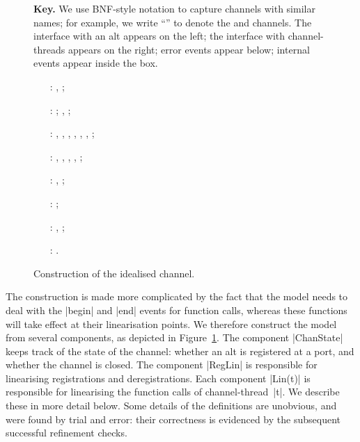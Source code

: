 \begin{figure}

\uncspMid
\textbf{Key.}  We use BNF-style notation to capture
channels with similar names; for example, we write
``\m{}'' to denote the  and
 channels.  The interface with an alt appears on the left; the
interface with channel-threads appears on the right; error events appear
below; internal events appear inside the box. 

\raggedright
%
\begin{itemize}
\item[\inCircle{1}:]  \m{}\m{}, 
  \m{}\m{};

\item[\inCircle{2}:] \m{};
  \m{}, ;

\item[\inCircle{3}:] , ,
  , , , ,
  ;

\item[\inCircle{4}:] \m{},
  \m{}, \m{},
  \m{}, \m{};

\item[\inCircle{5}:] \m{},
  \m{};

\item[\inCircle{6}:] \m{};

\item[\inCircle{7}:] ,
  \m{};

\item[\inCircle{8}:] \m{}.
\end{itemize}
\caption{Construction of the idealised channel.  \label{fig:idealised-chan}}
\end{figure}

\cspMid


The construction is made more complicated by the fact that the model needs to
deal with the |begin| and |end| events for function calls, whereas these
functions will take effect at their linearisation points.  We therefore
construct the model from several components, as depicted in
Figure~\ref{fig:idealised-chan}.  The component |ChanState| keeps track of the
state of the channel: whether an alt is registered at a port, and whether the
channel is closed.  The component |RegLin| is responsible for linearising
registrations and deregistrations.  Each component |Lin(t)| is responsible for
linearising the function calls of channel-thread~|t|.  We describe these in
more detail below.  Some details of the definitions are unobvious, and were
found by trial and error: their correctness is evidenced by the subsequent
successful refinement checks. 

